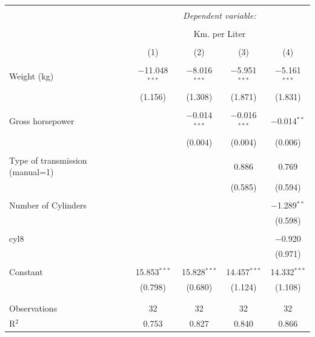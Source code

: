 \documentclass[aspectratio=169]{beamer}
\begin{document}
\begin{frame}

\vspace{-1cm}

\tiny

\begin{table}[!htbp] \centering 
  \caption{} 
  \label{} 
\begin{tabular}{@{\extracolsep{5pt}}lcccc} 
\\[-1.8ex]\hline 
\hline \\[-1.8ex] 
 & \multicolumn{4}{c}{\textit{Dependent variable:}} \\ 
\cline{2-5} 
\\[-1.8ex] & \multicolumn{4}{c}{Km. per Liter} \\ 
\\[-1.8ex] & (1) & (2) & (3) & (4)\\ 
\hline \\[-1.8ex] 
 Weight (kg) & $-$11.048$^{***}$ & $-$8.016$^{***}$ & $-$5.951$^{***}$ & $-$5.161$^{***}$ \\ 
  & (1.156) & (1.308) & (1.871) & (1.831) \\ 
  & & & & \\ 
 Gross horsepower &  & $-$0.014$^{***}$ & $-$0.016$^{***}$ & $-$0.014$^{**}$ \\ 
  &  & (0.004) & (0.004) & (0.006) \\ 
  & & & & \\ 
 Type of transmission (manual=1) &  &  & 0.886 & 0.769 \\ 
  &  &  & (0.585) & (0.594) \\ 
  & & & & \\ 
 Number of Cylinders &  &  &  & $-$1.289$^{**}$ \\ 
  &  &  &  & (0.598) \\ 
  & & & & \\ 
 cyl8 &  &  &  & $-$0.920 \\ 
  &  &  &  & (0.971) \\ 
  & & & & \\ 
 Constant & 15.853$^{***}$ & 15.828$^{***}$ & 14.457$^{***}$ & 14.332$^{***}$ \\ 
  & (0.798) & (0.680) & (1.124) & (1.108) \\ 
  & & & & \\ 
\hline \\[-1.8ex] 
Observations & 32 & 32 & 32 & 32 \\ 
R$^{2}$ & 0.753 & 0.827 & 0.840 & 0.866 \\ 

\end{tabular}
\end{table}
\end{frame}
\end{document}
